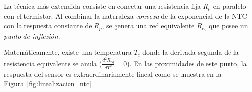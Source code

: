 La técnica más extendida consiste en conectar una resistencia fija $R_p$ en paralelo con el termistor. Al combinar la naturaleza \emph{convexa} de la exponencial de la NTC con la respuesta constante de $R_p$, se genera una red equivalente $R_{eq}$ que posee un \emph{punto de inflexión}.

Matemáticamente, existe una temperatura $T_c$ donde la derivada segunda de la resistencia equivalente se anula ($\frac{d^2 R_{eq}}{dT^2} = 0$). En las proximidades de este punto, la respuesta del sensor es extraordinariamente lineal como se muestra en la Figura~\ref{fig:linealizacion_ntc}.

\begin{marginfigure}
    \centering
    \shorthandoff{>}
    \caption[Efecto de la linealización analógica.]{Efecto de la linealización analógica. La curva azul muestra cómo el sacrificio de sensibilidad global permite obtener una respuesta lineal en el rango central del diseño.}\label{fig:linealizacion_ntc}
\end{marginfigure}

